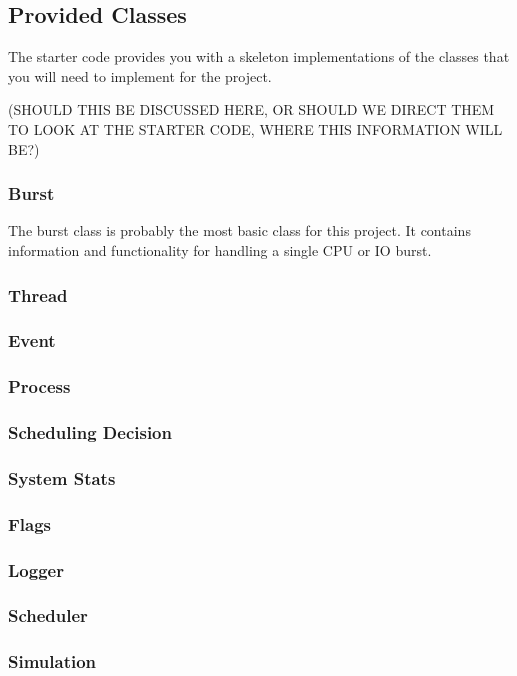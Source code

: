 \documentclass[main.tex]{subfiles}
\begin{document}
\subsection{Provided Classes}

The starter code provides you with a skeleton implementations of the classes that you will need to implement for the project. 

(SHOULD THIS BE DISCUSSED HERE, OR SHOULD WE DIRECT THEM TO LOOK AT THE STARTER CODE, WHERE THIS INFORMATION WILL BE?)

\subsubsection{Burst}

The burst class is probably the most basic class for this project. It contains information and functionality for handling a single CPU or IO burst.

\subsubsection{Thread}

\subsubsection{Event}

\subsubsection{Process}

\subsubsection{Scheduling Decision}

\subsubsection{System Stats}

\subsubsection{Flags}

\subsubsection{Logger}

\subsubsection{Scheduler}

\subsubsection{Simulation}
\end{document}
